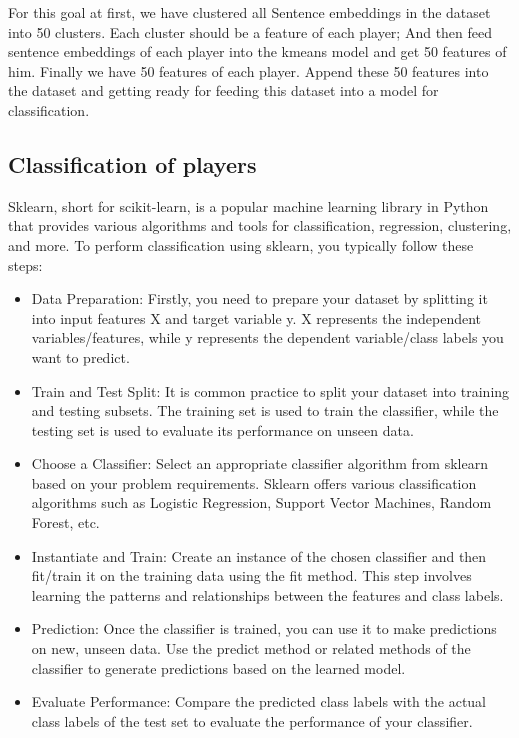 \documentclass{article}
\begin{document}
For this goal at first, we have clustered all Sentence embeddings in the dataset into 50 clusters. Each cluster should be a feature of each player; And then feed sentence embeddings of each player into the kmeans model and get 50 features of him.
Finally we have 50 features of each player. Append these 50 features into the dataset and getting ready for feeding this dataset into a model for classification.

\subsection{Classification of players}
Sklearn, short for scikit-learn, is a popular machine learning library in Python that provides various algorithms and tools for classification, regression, clustering, and more. To perform classification using sklearn, you typically follow these steps:
\begin{itemize}
    \item Data Preparation: Firstly, you need to prepare your dataset by splitting it into input features X and target variable y. X represents the independent variables/features, while y represents the dependent variable/class labels you want to predict.
    \item Train and Test Split: It is common practice to split your dataset into training and testing subsets. The training set is used to train the classifier, while the testing set is used to evaluate its performance on unseen data.
    \item Choose a Classifier: Select an appropriate classifier algorithm from sklearn based on your problem requirements. Sklearn offers various classification algorithms such as Logistic Regression, Support Vector Machines, Random Forest, etc.
    \item Instantiate and Train: Create an instance of the chosen classifier and then fit/train it on the training data using the fit method. This step involves learning the patterns and relationships between the features and class labels.
    \item Prediction: Once the classifier is trained, you can use it to make predictions on new, unseen data. Use the predict method or related methods of the classifier to generate predictions based on the learned model.
    \item Evaluate Performance: Compare the predicted class labels with the actual class labels of the test set to evaluate the performance of your classifier.
\end{itemize}
\end{document}
